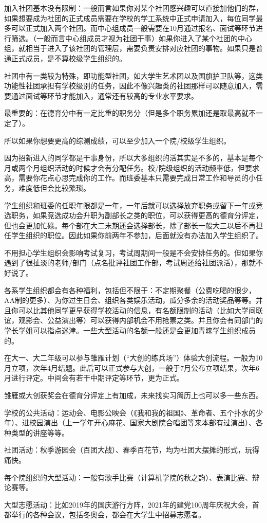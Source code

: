 加入社团基本没有限制：一般而言如果你对某个社团感兴趣可以直接加他们的群，如果想要成为社团的正式成员需要在学校的学工系统中正式申请加入，每位同学最多可以正式加入两个社团。而中心组成员一般需要在10月通过报名、面试等环节进行筛选。（一般而言中心组成员才视为社团干事）如果你进入了某个社团的中心组，就相当于进入了该社团的管理层，需要负责安排对应社团的事物。如果只是普通正式成员，是不算校级学生组织的。

社团中有一类较为特殊，即功能型社团，如大学生艺术团以及国旗护卫队等，这类功能性社团承担有学校级别的任务，因此不像兴趣类的社团那样可以随意加入，需要通过面试等环节才能加入，通常还有较高的专业水平要求。



最重要的：在德育分中有一定比重的职务分（但是多个职务累加还是取最高就不一定了）。

所以如果你想要更高的综测成绩，可以至少加入一个院/校级学生组织。

因为招新进入的同学都是干事身份，所以大多组织的活其实是不多的，基本是每个月或两个月组织活动的时候才会有分配任务。校/院级组织的活动频率低，但要求高，需要你花点心思完成你的工作。而班委基本只需要完成日常工作和导员的小任务，难度低但会比较繁琐。

学生组织和班委的任职年限都是一年，一年后就可以选择放弃职务或留下一年或竞选职务，如果竞选成功会升职为副部长之类的职位，可以获得更高的德育分评定，但也会更加忙碌。每个部在大二末期还会选择部长，除了部长一般大三以后不再担任学生组织的职位。因此如果你前两年不参加，后面就没有办法加入学生组织了。

不用担心学生组织会影响考试复习，考试周期间一般是不会安排任务的。但如果你遇到了很扯淡的老师/部门（点名批评社团工作部，考试周还给社团派活），那就不好说了。

各系学生组织都会有各种福利，包括但不限于：不定期聚餐（公费吃喝的很少，AA制的更多）、为你过生日会、组织各类娱乐活动，瓜分多余的活动奖品等等。并且你可以比其他同学更早获得学校活动的信息，有名额限制的活动（比如大学间联谊，观影会、公益演出等）可以获得内部机会不用抢票之类。并且你会有同部门的学长学姐可以指点迷津。一些大型活动的名额一般还是会更加青睐学生组织成员的。


在大一、大二年级可以参与雏雁计划（“大创的练兵场”）体验大创流程。一般为10月立项，次年4月结题。此后可以正式参与大创，一般于7月公布立项结果，次年6月进行评定。中间会有若干中期评定等环节，更为正式。

雏雁或大创获奖会在德育分评定上有加成，未来找实习简历上也可以多一些东西。


学校的公共活动：运动会、电影公映会（《我和我的祖国》、革命者、五个扑水的少年）、进校园演出（上一学年开心麻花、国家大剧院合唱团等来本部有过演出）、各种类型的讲座等等。

社团活动：秋季游园会（百团大战）、春季百花节，均为社团大摆摊的形式，玩得痛快。

每个院组织的大型活动：一般有歌手比赛（计算机学院的秋之韵）、表演比赛、辩论赛等。

大型志愿活动：比如2019年的国庆游行方阵，2021年的建党100周年庆祝大会，首都举行的各种会议，包括冬奥会，都会在大学生中招募志愿者。

